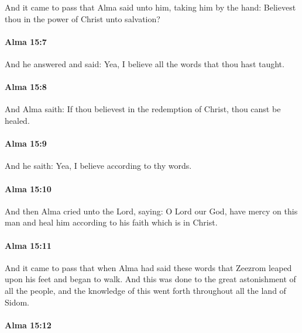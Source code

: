 			And it came to pass that Alma said unto him, taking him by the hand:
			Believest thou in the power of Christ unto salvation?

		\paragraph{Alma 15:7} %
			\label{ALMA-15-7}

			And he answered and said:
			Yea, I believe all the words that thou hast taught.

		\paragraph{Alma 15:8} %
			\label{ALMA-15-8}

			And Alma saith:
			If thou believest in the redemption of Christ,
			thou canst be healed.

		\paragraph{Alma 15:9} %
			\label{ALMA-15-9}

			And he saith:
			Yea, I believe according to thy words.

		\paragraph{Alma 15:10} %
			\label{ALMA-15-10}

			And then Alma cried unto the Lord, saying:
			O Lord our God, have mercy on this man and heal him
			according to his faith which is in Christ.

		\paragraph{Alma 15:11} %
			\label{ALMA-15-11}

			And it came to pass that when Alma had said these words
			that Zeezrom leaped upon his feet and began to walk.
			And this was done to the great astonishment of all the people,
			and the knowledge of this went forth throughout all the land of Sidom.

		\paragraph{Alma 15:12} %
			\label{ALMA-15-12}

